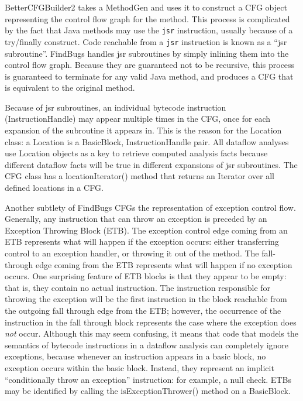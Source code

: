 \documentclass[11pt]{article}
\begin{document}
BetterCFGBuilder2 takes a MethodGen and uses it to construct a CFG object
representing the control flow graph for the method.
This process is complicated by the fact that Java methods may use
the {\tt jsr} instruction, usually because of a try/finally construct.
Code reachable from a {\tt jsr} instruction is known as a ``jsr subroutine''.
FindBugs handles jsr subroutines by simply inlining them into the control flow graph.
Because they are guaranteed not to be recursive, this process is guaranteed to
terminate for any valid Java method, and produces a CFG that is equivalent to the
original method.

Because of jsr subroutines, an individual bytecode instruction (InstructionHandle) may appear
multiple times in the CFG, once for each expansion of the subroutine it appears in.
This is the reason for the Location class: a Location is a BasicBlock, InstructionHandle
pair.  All dataflow analyses use Location objects as a key to retrieve computed
analysis facts
because different dataflow facts will be true in different expansions
of jsr subroutines.
The CFG class has a locationIterator() method that returns an
Iterator over all defined locations in a CFG.

Another subtlety of FindBugs CFGs
the representation of exception control flow.
Generally, any instruction that can throw an exception is
preceded by an Exception Throwing Block (ETB).  The exception control
edge coming from an ETB represents what will happen if the exception occurs:
either transferring control to an exception handler, or throwing it out
of the method.  The fall-through edge coming from the ETB represents
what will happen if no exception occurs.  One surprising feature of
ETB blocks is that they appear to be empty: that is, they contain no
actual instruction.
The instruction responsible for throwing the exception will be the first instruction in
the block reachable from the outgoing fall through edge from
the ETB; however, the occurrence of the instruction in the fall through
block represents the case where the exception does {\em not} occur.
Although this may seem confusing, it means that code that models the
semantics of bytecode instructions in a dataflow analysis
can completely ignore exceptions, because whenever an instruction appears
in a basic block, no exception occurs within the basic block.
Instead, they represent an implicit ``conditionally throw an
exception'' instruction: for example, a null check.  ETBs may be
identified by calling the isExceptionThrower() method on a BasicBlock.
\end{document}
